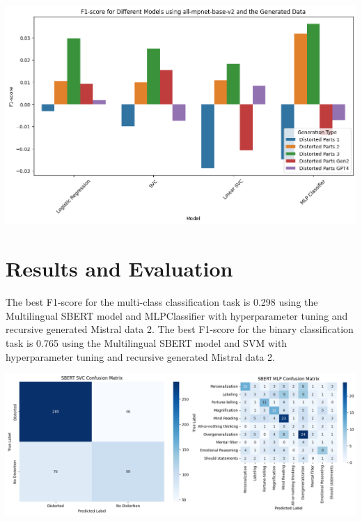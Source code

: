 \documentclass[a0,landscape]{a0poster}
\begin{document}
\begin{multicols}{4}
\begin{center}
\includegraphics[width=0.96\linewidth]{figures/generatedDataDiffDiff.png}
\end{center}\vspace{1cm}


\color{Teal}
\section*{Results and Evaluation}
\color{Black}

The best F1-score for the multi-class classification task is 0.298 using the Multilingual SBERT model and MLPClassifier with hyperparameter tuning and recursive generated Mistral data 2. 
The best F1-score for the binary classification task is 0.765 using the Multilingual SBERT model and SVM with hyperparameter tuning and recursive generated Mistral data 2. 

\begin{center}
\includegraphics[width=0.96\linewidth]{figures/finalGraphs.png}
\end{center}\vspace{1cm}


\end{multicols}
\end{document}
